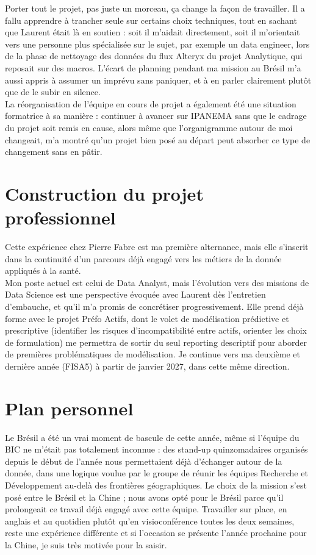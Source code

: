 Porter tout le projet, pas juste un morceau, ça change la façon de travailler. Il a fallu 
apprendre à trancher seule sur certains choix techniques, tout en sachant que Laurent était 
là en soutien : soit il m'aidait directement, soit il m'orientait vers une personne plus 
spécialisée sur le sujet, par exemple un data engineer, lors de la phase de nettoyage des 
données du flux Alteryx du projet Analytique, qui reposait sur des macros. L'écart de 
planning pendant ma mission au Brésil m'a aussi appris à assumer un imprévu sans 
paniquer, et à en parler clairement plutôt que de le subir en silence. \\

La réorganisation de l'équipe en cours de projet a également été une situation 
formatrice à sa manière : continuer à avancer sur IPANEMA sans que le cadrage du projet 
soit remis en cause, alors même que l'organigramme autour de moi changeait, m'a montré 
qu'un projet bien posé au départ peut absorber ce type de changement sans en pâtir.

\section{Construction du projet professionnel}

Cette expérience chez Pierre Fabre est ma première alternance, mais elle s'inscrit dans 
la continuité d'un parcours déjà engagé vers les métiers de la donnée appliqués à la santé. \\

Mon poste actuel est celui de Data Analyst, mais l'évolution vers des missions de Data 
Science est une perspective évoquée avec Laurent dès l'entretien d'embauche, et qu'il m'a 
promis de concrétiser progressivement. Elle prend déjà forme avec le projet Préfo Actifs, 
dont le volet de modélisation prédictive et prescriptive (identifier les risques d'incompatibilité 
entre actifs, orienter les choix de formulation) me permettra de sortir du seul reporting descriptif pour aborder de premières problématiques de modélisation. Je continue vers ma 
deuxième et dernière année (FISA5) à partir de janvier 2027, dans cette même direction.

\section{ Plan personnel }

Le Brésil a été un vrai moment de bascule de cette année, même si l'équipe du BIC ne 
m'était pas totalement inconnue : des stand-up quinzomadaires organisés depuis le début de 
l'année nous permettaient déjà d'échanger autour de la donnée, dans une logique voulue par 
le groupe de réunir les équipes Recherche et Développement au-delà des frontières 
géographiques. Le choix de la mission s'est posé entre le Brésil et la Chine ; nous avons 
opté pour le Brésil parce qu'il prolongeait ce travail déjà engagé avec cette équipe. Travailler 
sur place, en anglais et au quotidien plutôt qu'en visioconférence toutes les deux semaines, 
reste une expérience différente et si l'occasion se présente l'année prochaine pour la Chine, 
je suis très motivée pour la saisir. \\

